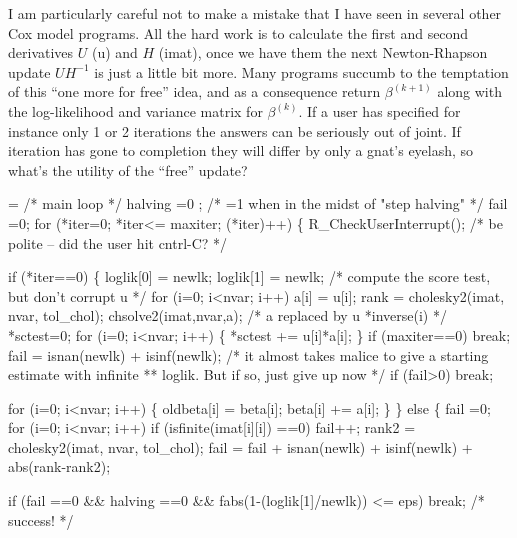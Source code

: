 \documentclass{article}
\begin{document}
I am particularly careful not to make a mistake that I have seen in several
other Cox model programs.  All the hard work is to calculate the first
and second derivatives $U$ (u) and $H$ (imat), once we have them the next
Newton-Rhapson update $UH^{-1}$ is just a little bit more.  Many programs
succumb to the temptation of this ``one more for free'' idea, and as a
consequence return $\beta^{(k+1)}$ along with the log-likelihood and
variance matrix for $\beta^{(k)}$.
If a user has specified
for instance only 1 or 2 iterations the answers can be seriously
out of joint.
If iteration has gone to completion they will differ by only a gnat's
eyelash, so what's the utility of the ``free'' update?

\begin{nwchunk}
=
 /* main loop */
 halving =0 ;             /* =1 when in the midst of "step halving" */
 fail =0;
 for (*iter=0; *iter<= maxiter; (*iter)++) \{
     R_CheckUserInterrupt();  /* be polite -- did the user hit cntrl-C? */
 
     if (*iter==0) \{
         loglik[0] = newlk;
         loglik[1] = newlk;
         /* compute the score test, but don't corrupt u */
         for (i=0; i<nvar; i++) a[i] = u[i];
         rank = cholesky2(imat, nvar, tol_chol);
         chsolve2(imat,nvar,a);        /* a replaced by  u *inverse(i) */
         *sctest=0;
         for (i=0; i<nvar; i++) \{
            *sctest +=  u[i]*a[i];
         \}
         if (maxiter==0) break;
         fail = isnan(newlk) + isinf(newlk);
         /* it almost takes malice to give a starting estimate with infinite
         **  loglik.  But if so, just give up now */
         if (fail>0) break;
         
         for (i=0; i<nvar; i++) \{
               oldbeta[i] = beta[i];
             beta[i] += a[i];
         \}        
     \}
     else \{ 
         fail =0;
         for (i=0; i<nvar; i++) 
             if (isfinite(imat[i][i]) ==0) fail++;
         rank2 = cholesky2(imat, nvar, tol_chol);
         fail = fail + isnan(newlk) + isinf(newlk) + abs(rank-rank2);
  
         if (fail ==0 && halving ==0 &&
             fabs(1-(loglik[1]/newlk)) <= eps) break;  /* success! */
 

\end{nwchunk}
\end{document}
